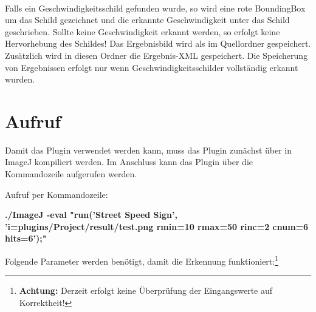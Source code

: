 \paragraph*{}
Falls ein Geschwindigkeitsschild gefunden wurde, so wird eine rote BoundingBox um das Schild gezeichnet und die erkannte Geschwindigkeit unter das Schild geschrieben.
Sollte keine Geschwindigkeit erkannt werden, so erfolgt keine Hervorhebung des Schildes!
Das Ergebnisbild wird als  im Quellordner gespeichert.
Zusätzlich wird in diesen Ordner die Ergebnis-XML gespeichert.
Die Speicherung von Ergebnissen erfolgt nur wenn Geschwindigkeitsschilder vollständig erkannt wurden.

\pagebreak
\section{Aufruf}
Damit das Plugin verwendet werden kann, muss das Plugin zunächst über  in ImageJ kompiliert werden.
Im Anschluss kann das Plugin über die Kommandozeile aufgerufen werden.

Aufruf per Kommandozeile:

\begin{small}
\textbf{./ImageJ -eval "run('Street Speed Sign', 'i=plugins/Project/result/test.png rmin=10 rmax=50 rinc=2 cnum=6 hits=6');"}
\end{small}

Folgende Parameter werden benötigt, damit die Erkennung funktioniert:\footnote{\textbf{Achtung:} Derzeit erfolgt keine Überprüfung der Eingangswerte auf Korrektheit!}


